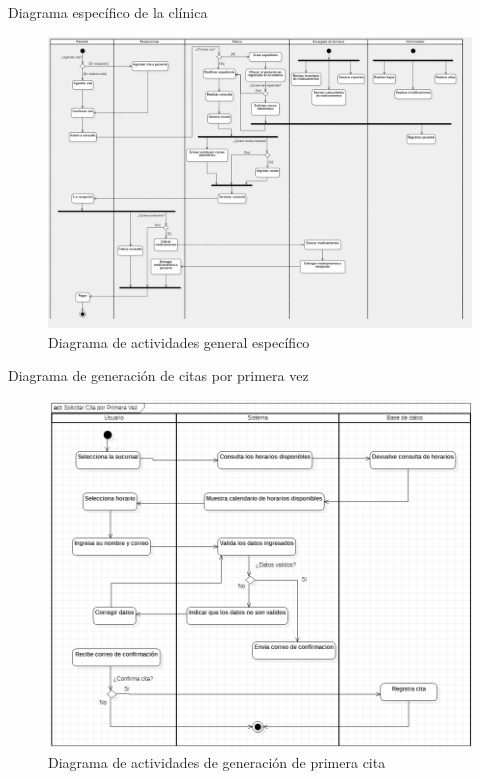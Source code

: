 \documentclass[12pt,letterpaper]{article}
\begin{document}
        \newpage
        Diagrama específico de la clínica
        \begin{figure}[H]
            \centering
            \includegraphics [scale=0.1]{actividades/generalEspecifico4K}
            \caption{Diagrama de actividades general específico}
        \end{figure}

        \newpage
        Diagrama de generación de citas por primera vez
        \begin{figure}[H]
            \centering
            \includegraphics [scale=0.7]{actividades/citaPrimeraVez}
            \caption{Diagrama de actividades de generación de primera cita}
        \end{figure}
\end{document}
